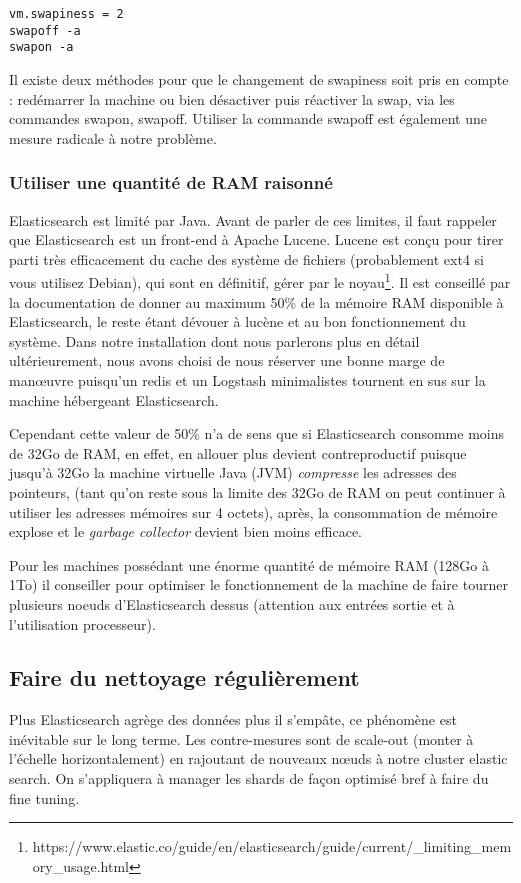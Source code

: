 \begin{lstlisting}[style=code,label={lst:configswapiness},caption={Configuration swapiness}]
vm.swapiness = 2
swapoff -a
swapon -a
\end{lstlisting}
Il existe deux méthodes pour que le changement de swapiness soit pris en compte :
redémarrer la machine ou bien désactiver puis réactiver la swap, via les commandes
swapon, swapoff. Utiliser la commande swapoff est également une mesure radicale à 
notre problème.

\subsubsection{Utiliser une quantité de RAM raisonné}
Elasticsearch est limité par Java. Avant de parler de ces limites, il faut rappeler 
que Elasticsearch est un front-end à Apache Lucene. Lucene est conçu pour tirer 
parti très efficacement du cache des système de fichiers (probablement ext4 si 
vous utilisez Debian), qui sont en définitif, gérer par le 
noyau\footnote{https://www.elastic.co/guide/en/elasticsearch/guide/current/\_limiting\_memory\_usage.html}.
Il est conseillé par la documentation de donner au maximum 50\% de la mémoire RAM
disponible à Elasticsearch, le reste étant dévouer à lucène et au bon fonctionnement
du système.
Dans notre installation dont nous parlerons plus en détail ultérieurement, nous 
avons choisi de nous réserver une bonne marge de manœuvre puisqu'un redis et un Logstash
minimalistes tournent en sus sur la machine hébergeant Elasticsearch.

Cependant cette valeur de 50\% n'a de sens que si Elasticsearch consomme moins de 
32Go de RAM, en effet, en allouer plus devient contreproductif puisque jusqu'à 32Go
la machine virtuelle Java (JVM) \textit{compresse} les adresses des pointeurs, 
(tant qu'on reste sous la limite des 32Go de RAM on peut continuer à utiliser les 
adresses mémoires sur 4 octets), après, la consommation de mémoire explose et le
\textit{garbage collector} devient bien moins efficace.

Pour les machines possédant une énorme quantité de mémoire RAM (128Go à 1To)
il conseiller pour optimiser le fonctionnement de la machine de faire tourner plusieurs
noeuds d'Elasticsearch dessus (attention aux entrées sortie et à l'utilisation processeur).

\subsection{Faire du nettoyage régulièrement}
Plus Elasticsearch agrège des données plus il s'empâte, ce phénomène est inévitable 
sur le long terme. Les contre-mesures sont de scale-out (monter à l'échelle horizontalement)
en rajoutant de nouveaux nœuds à notre cluster elastic search. On s'appliquera à 
manager les shards de façon optimisé bref à faire du fine tuning.

